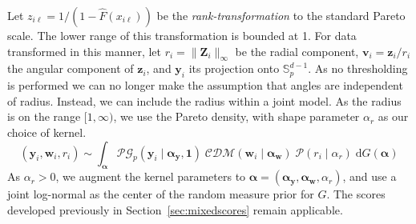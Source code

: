 Let $z_{i\ell} = 1/(1 - \hat{F}(x_{i\ell}))$ be the 
    \emph{rank-transformation} to the standard Pareto scale.  The lower range 
    of this transformation is bounded at 1. For data transformed in this manner, 
    let $r_i = \lVert \bm{Z}_i\rVert_{\infty}$ be the radial component, 
    $\bm{v}_i = \bm{z}_i/r_i$ the angular component of $\bm{z}_i$, and 
    $\bm{y}_i$ its projection onto $\mathbb{S}_p^{d-1}$.  
    As no thresholding is performed we can no longer make the assumption that 
    angles are independent of radius.  Instead, we can include the radius 
    within a joint model.  As the radius is on the range $[1,\infty)$, 
    we use the Pareto density, with shape parameter $\alpha_r$ as our choice 
    of kernel.  
    \begin{equation}
        \label{model:rank}
        (\bm{y}_i,\bm{w}_i,r_i) \sim \int_{\bm{\alpha}}
            \mathcal{PG}_p(\bm{y}_i\mid\bm{\alpha}_{\bm{y}}, \bm{1})\;
            \mathcal{CDM}(\bm{w}_i\mid\bm{\alpha}_{\bm{w}})\;
            \mathcal{P}(r_i\mid\alpha_r)\;
            \text{d}G(\bm{\alpha})
    \end{equation}
    As $\alpha_r > 0$, we augment the kernel parameters to $\bm{\alpha}= 
    (\bm{\alpha}_{\bm{y}}, \bm{\alpha}_{\bm{w}}, \alpha_r)$, and use a joint log-normal
    as the center of the random measure prior for $G$. The scores developed previously in 
    Section~\ref{sec:mixedscores} remain applicable.


